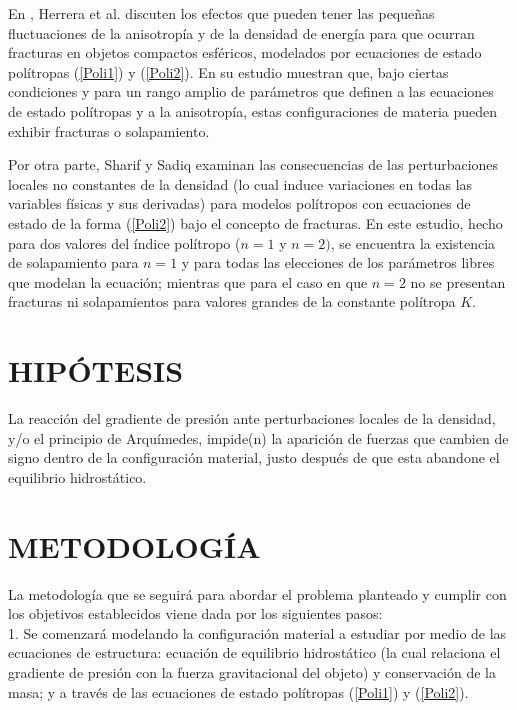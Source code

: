 \documentclass[letterpaper,11pt]{article}
\begin{document}
En \cite{HerreraFuenmayorLeon2016}, Herrera et al. discuten los efectos que pueden tener las pequeñas fluctuaciones de la anisotropía y de la densidad de energía para que ocurran fracturas en objetos compactos esféricos, modelados por ecuaciones de estado polítropas (\ref{Poli1}) y (\ref{Poli2}). En su estudio muestran que, bajo ciertas condiciones y para un rango amplio de parámetros que definen a las ecuaciones de estado polítropas y a la anisotropía, estas configuraciones de materia pueden exhibir fracturas o solapamiento.


Por otra parte, Sharif y Sadiq \cite{sharif2018cracking} examinan las consecuencias de las perturbaciones locales no constantes de la densidad (lo cual induce variaciones en todas las variables físicas y sus derivadas) para modelos polítropos con ecuaciones de estado de la forma (\ref{Poli2}) bajo el concepto de fracturas. En este estudio, hecho para dos valores del índice polítropo ($n = 1$ y $n = 2)$, se encuentra la existencia de solapamiento para $n = 1$ y para todas las elecciones de los parámetros libres que modelan la ecuación; mientras que para el caso en que $n=2$ no se presentan fracturas ni solapamientos para valores grandes de la constante polítropa $K$. 




    
\section{HIPÓTESIS}

La reacción del gradiente de presión ante perturbaciones locales de la densidad, y/o el principio de Arquímedes, impide(n) la aparición de fuerzas que cambien de signo dentro de la configuración material, justo después de que esta abandone el equilibrio hidrostático.
    
\section{METODOLOGÍA}
La metodología que se seguirá para abordar el problema planteado y cumplir con los objetivos establecidos viene dada por los siguientes pasos: \\

1. Se comenzará modelando la configuración material a estudiar por medio de las ecuaciones de estructura: ecuación de equilibrio hidrostático (la cual relaciona el gradiente de presión con la fuerza gravitacional del objeto) y conservación de la masa; y a través de las ecuaciones de estado polítropas (\ref{Poli1}) y (\ref{Poli2}). \\
\end{document}

